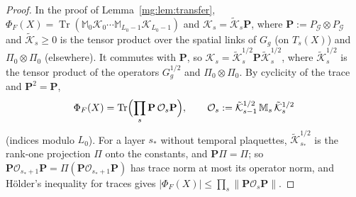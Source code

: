 \documentclass[11pt,a4paper]{article}
\theoremstyle{definition}
\theoremstyle{remark}
\DeclareMathOperator{\Tr}{Tr}
\newcommand{\norm}[1]{\lVert #1\rVert}
\begin{document}
\begin{proof}
In the proof of Lemma~\ref{mg:lem:transfer}, $\Phi_F(X)=\Tr(\mathbb M_0\mathcal K_0\cdots\mathbb M_{L_0-1}\mathcal K_{L_0-1})$ and $\mathcal K_s=\tilde{\mathcal
K}_s\mathbf P$, where $\mathbf P:=P_{\mathcal G}\otimes P_{\mathcal G}$ and $\tilde{\mathcal K}_s\ge0$ is the tensor product over the spatial links of
$G_g$ (on $T_s(X)$) and $\Pi_0\otimes\Pi_0$ (elsewhere). It commutes with $\mathbf P$, so $\mathcal K_s=\tilde{\mathcal K}_s^{1/2}\mathbf P\tilde{\mathcal
K}_s^{1/2}$, where $\tilde{\mathcal K}_s^{1/2}$ is the tensor product of the operators $G_g^{1/2}$ and $\Pi_0\otimes\Pi_0$. By cyclicity of the trace and
$\mathbf P^2=\mathbf P$,
\[
\Phi_F(X)=\Tr\Bigl(\prod_s\mathbf P\,\mathcal O_s\mathbf P\Bigr),\qquad\mathcal O_s:=\tilde{\mathcal K}_{s-1}^{1/2}\,\mathbb M_s\,\tilde{\mathcal K}_s^{1/2}
\]
(indices modulo $L_0$). For a layer $s_*$ without temporal plaquettes, $\tilde{\mathcal K}_{s_*}^{1/2}$ is the rank-one projection $\Pi$ onto the constants,
and $\mathbf P\Pi=\Pi$; so $\mathbf P\mathcal O_{s_*+1}\mathbf P=\Pi(\mathbf P\mathcal O_{s_*+1}\mathbf P)$ has trace norm at most its operator norm, and
H\"older's inequality for traces gives $|\Phi_F(X)|\le\prod_s\norm{\mathbf P\mathcal O_s\mathbf P}$.


\end{proof}
\end{document}
